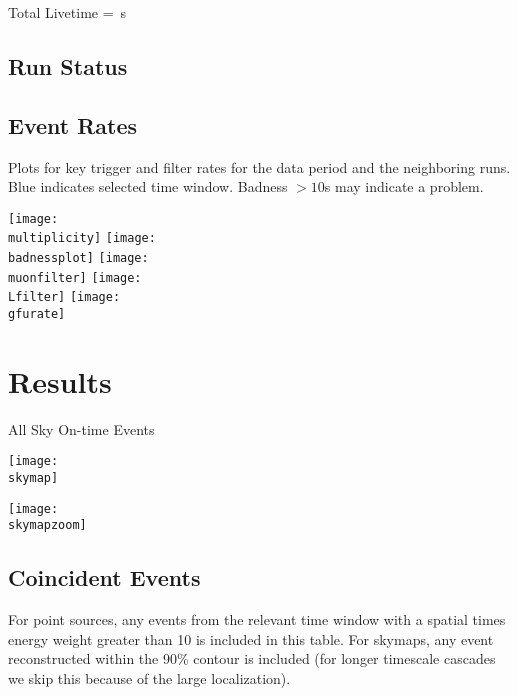 \documentclass[titlepage]{article}
\begin{document}
Total Livetime = \livetime\,s

\subsection{Run Status}
\runstatustable

\pagebreak
\subsection{Event Rates}
Plots for key trigger and filter rates for the data period
and the neighboring runs.  Blue indicates selected time window.
Badness $>10$s may indicate a problem.

\vspace{1em}
{
 \centering        
 \texttt{[image: \\multiplicity]}
 \texttt{[image: \\badnessplot]}
 \texttt{[image: \\muonfilter]}
 \texttt{[image: \\Lfilter]}
 \texttt{[image: \\gfurate]}
}


%
%
%
%
%
%
%

\pagebreak
\section{Results}

{
  \centering
  {\Large All Sky On-time Events}

  \texttt{[image: \\skymap]}

  \texttt{[image: \\skymapzoom]}
  
}
\pagebreak


\subsection{Coincident Events}
For point sources, any events from the relevant time window with a spatial times energy weight greater than 10 is included in this table. For skymaps, any event reconstructed within the 90\% contour is included (for longer timescale cascades we skip this because of the large localization). 
\event
\end{document}
